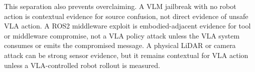 This separation also prevents overclaiming. A VLM jailbreak with no robot action is contextual evidence for source confusion, not direct evidence of unsafe VLA action. A ROS2 middleware exploit is embodied-adjacent evidence for tool or middleware compromise, not a VLA policy attack unless the VLA system consumes or emits the compromised message. A physical LiDAR or camera attack can be strong sensor evidence, but it remains contextual for VLA action unless a VLA-controlled robot rollout is measured.

